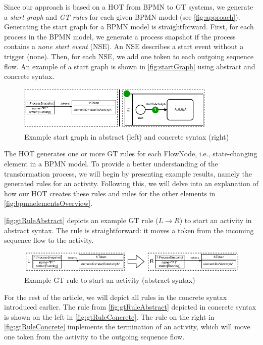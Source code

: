 \documentclass{lmcs} %
\begin{document}
Since our approach is based on a HOT from BPMN to GT systems, we generate a \textit{start graph} and \textit{GT rules} for each given BPMN model (see \autoref{fig:approach}).
Generating the start graph for a BPMN model is straightforward.
First, for each process in the BPMN model, we generate a process snapshot if the process contains a \textit{none start event} (NSE).
An NSE describes a start event without a trigger (none).
Then, for each NSE, we add one token to each outgoing sequence flow.
An example of a start graph is shown in \autoref{fig:startGraph} using abstract and concrete syntax.

\begin{figure}[ht]
    \centering
    \includegraphics[width=0.85\textwidth]{images/startGraph.pdf}
    \caption{Example start graph in abstract (left) and concrete syntax (right)}
    \label{fig:startGraph}
\end{figure}


The HOT generates one or more GT rules for each \textsf{FlowNode}, i.e., state-changing element in a BPMN model.
To provide a better understanding of the transformation process, we will begin by presenting example results, namely the generated rules for an activity.
Following this, we will delve into an explanation of how our HOT creates these rules and rules for the other elements in \autoref{fig:bpmnelementsOverview}.

\autoref{fig:gtRuleAbstract} depicts an example GT rule ($L \to R$) to start an activity in abstract syntax.
The rule is straightforward: it moves a token from the incoming sequence flow to the activity.

\begin{figure}[ht]
    \centering
  \includegraphics[width=1\textwidth]{images/rule_abstract.pdf}
  \caption{Example GT rule to start an activity (abstract syntax)}  \label{fig:gtRuleAbstract}
\end{figure}

For the rest of the article, we will depict all rules in the concrete syntax introduced earlier.
The rule from \autoref{fig:gtRuleAbstract} depicted in concrete syntax is shown on the left in \autoref{fig:gtRuleConcrete}.
The rule on the right in \autoref{fig:gtRuleConcrete} implements the termination of an activity, which will move one token from the activity to the outgoing sequence flow.
\end{document}
